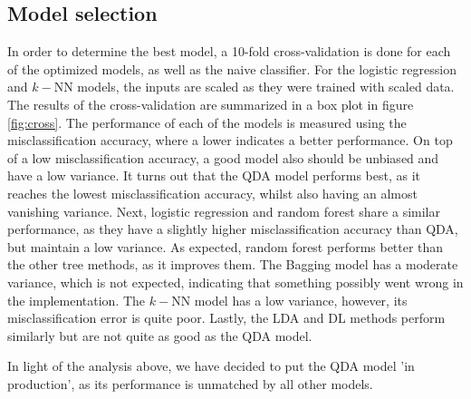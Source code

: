 \documentclass{article}
\begin{document}
\subsection{Model selection}
In order to determine the best model, a 10-fold cross-validation is done for each of the optimized models, as well as the naive classifier. For the logistic regression and $k-$NN models, the inputs are scaled as they were trained with scaled data. The results of the cross-validation are summarized in a box plot in figure \ref{fig:cross}. The performance of each of the models is measured using the misclassification accuracy, where a lower indicates a better performance. On top of a low misclassification accuracy, a good model also should be unbiased and have a low variance. It turns out that the QDA model performs best, as it reaches the lowest misclassification accuracy, whilst also having an almost vanishing variance. Next, logistic regression and random forest share a similar performance, as they have a slightly higher misclassification accuracy than QDA, but maintain a low variance. As expected, random forest performs better than the other tree methods, as it improves them. The Bagging model has a moderate variance, which is not expected, indicating that something possibly went wrong in the implementation. The $k-$NN model has a low variance, however, its misclassification error is quite poor. Lastly, the LDA and DL methods perform similarly but are not quite as good as the QDA model. 

In light of the analysis above, we have decided to put the QDA model 'in production', as its performance is unmatched by all other models.


\end{document}
